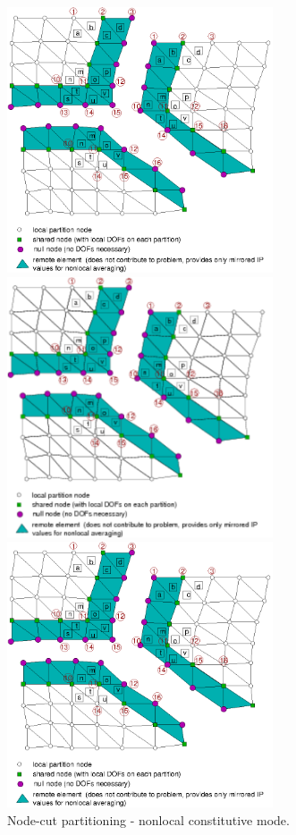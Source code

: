 \documentclass[a4paper]{article}
\begin{document}
\begin{figure}[htb]
\begin{htmlonly}
  \centerline{\includegraphics[width=0.7\textwidth]{nodecutnonloc1.eps}}
\end{htmlonly}
\ifpdf
\centerline{\includegraphics[width=0.7\textwidth]{nodecutnonloc1.pdf}}
\else
\centerline{\includegraphics[width=0.7\textwidth]{nodecutnonloc1.eps}}
\fi
\caption{Node-cut partitioning - nonlocal constitutive mode.}
\label{nodecut-nlm}
\end{figure}
\end{document}
